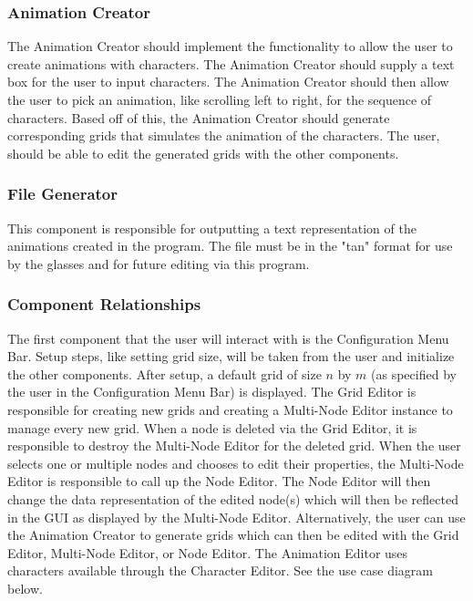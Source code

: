 \documentclass[12pt]{article}
\begin{document}
	\subsubsection{Animation Creator}
  	The Animation Creator should implement the functionality to allow the user to create animations with characters. The Animation Creator should supply a text box for the user to input characters. The Animation Creator should then allow the user to pick an animation, like scrolling left to right, for the sequence of characters.	
  	Based off of this, the Animation Creator should generate corresponding grids that simulates the animation of the characters. The user, should be able to edit the generated grids with the other components. 
	
	\subsubsection{File Generator}
  	This component is responsible for outputting a text representation of the animations created in the program. The file must be in the "tan" format for use by the glasses and for future editing via this program.
	
	\subsubsection{Component Relationships}
  	The first component that the user will interact with is the Configuration Menu Bar. Setup steps, like setting grid size, will be taken from the user and initialize the other components.	
  	After setup, a default grid of size $n$ by $m$ (as specified by the user in the Configuration Menu Bar) is displayed. The Grid Editor is responsible for creating new grids and creating a Multi-Node Editor instance to manage every new grid. When a node is deleted via the Grid Editor, it is responsible to destroy the Multi-Node Editor for the deleted grid.  	
  	When the user selects one or multiple nodes and chooses to edit their properties, the Multi-Node Editor is responsible to call up the Node Editor. The Node Editor will then change the data representation of the edited node(s) which will then be reflected in the GUI as displayed by the Multi-Node Editor.  	
  	Alternatively, the user can use the Animation Creator to generate grids which can then be edited with the Grid Editor, Multi-Node Editor, or Node Editor. The Animation Editor uses characters available through the Character Editor.  	
  	See the use case diagram below.	
    
\end{document}
